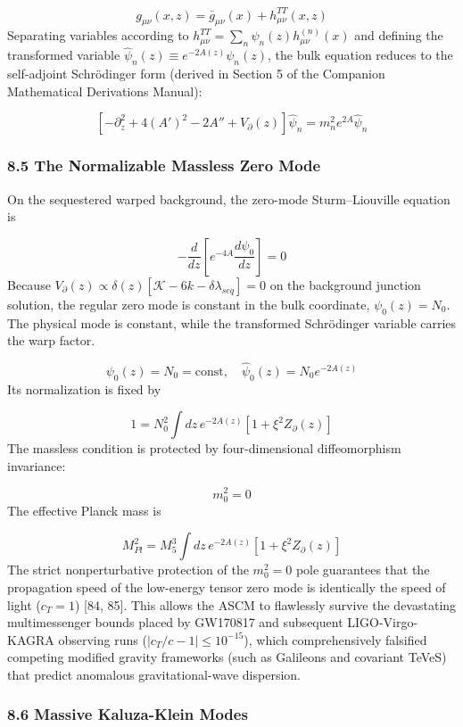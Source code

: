 \documentclass[aps,prd,onecolumn,superscriptaddress,nofootinbib,longbibliography,10pt]{revtex4-2}
\begin{document}
  \[ g_{\mu\nu}(x,z) = \bar{g}_{\mu\nu}(x) + h^{TT}_{\mu\nu}(x,z) \]
  Separating variables according to \(h^{TT}_{\mu\nu} = \sum_n \psi_n(z) h^{(n)}_{\mu\nu}(x)\) and defining the transformed variable \(\hat{\psi}_n(z) \equiv e^{-2A(z)}\psi_n(z)\), the bulk equation reduces to the self-adjoint Schrödinger form (derived in Section 5 of the Companion Mathematical Derivations Manual):


  \[ \left[ -\partial_z^2 + 4(A')^2 - 2A'' + V_\partial(z) \right] \hat{\psi}_n = m_n^2 e^{2A} \hat{\psi}_n \]

  
\subsubsection*{8.5 The Normalizable Massless Zero Mode}

  On the sequestered warped background, the zero-mode Sturm–Liouville equation is


  \[ -\frac{d}{dz}\left[ e^{-4A}\frac{d\psi_0}{dz} \right] = 0 \]
  Because \(V_\partial(z) \propto \delta(z)[\mathcal{K} - 6k - \delta\lambda_{seq}] = 0\) on the background junction solution, the regular zero mode is constant in the bulk coordinate, \(\psi_0(z) = N_0\). The physical mode is constant, while the transformed Schrödinger variable carries the warp factor.


  \[ \psi_0(z) = N_0 = \text{const}, \quad \hat{\psi}_0(z) = N_0 e^{-2A(z)} \]
  Its normalization is fixed by


  \[ 1 = N_0^2 \int dz\, e^{-2A(z)} [1 + \xi^2 Z_\partial(z)] \]
  The massless condition is protected by four-dimensional diffeomorphism invariance:


  \[ m_0^2 = 0 \]
  The effective Planck mass is


  \[ M_{Pl}^2 = M_5^3 \int dz\, e^{-2A(z)} [1 + \xi^2 Z_\partial(z)] \]
The strict nonperturbative protection of the \(m_0^2 = 0\) pole guarantees that the propagation speed of the low-energy tensor zero mode is identically the speed of light (\(c_T = 1\)) [84, 85]. This allows the ASCM to flawlessly survive the devastating multimessenger bounds placed by GW170817 and subsequent LIGO-Virgo-KAGRA observing runs (\(\vert c_T/c - 1\vert \le 10^{-15}\)), which comprehensively falsified competing modified gravity frameworks (such as Galileons and covariant TeVeS) that predict anomalous gravitational-wave dispersion.



  
\subsubsection*{8.6 Massive Kaluza-Klein Modes}
\end{document}
